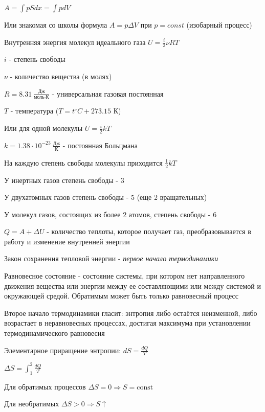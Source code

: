 \documentclass[12pt]{article}
\begin{document}
    $A = \int pS dx = \int p dV$

    Или знакомая со школы формула $A = p\Delta V$ при $p = const$ (изобарный процесс)

    Внутренняя энергия молекул идеального газа $U = \frac{i}{2} \nu R T$

    $i$ - степень свободы

    $\nu$ - количество вещества (в молях)

    $R = 8.31\ \frac{\text{Дж}}{\text{моль} \cdot \text{К}}$ - универсальная газовая постоянная

    $T$ - температура ($T = t^\circ C + 273.15$ К)

    Или для одной молекулы $U = \frac{i}{2} kT$

    $k = 1.38 \cdot 10^{-23}\ \frac{\text{Дж}}{\text{К}}$ - постоянная Больцмана

    На каждую степень свободы молекулы приходится $\frac{1}{2}kT$

    У инертных газов степень свободы - 3

    У двухатомных газов степень свободы - 5 (еще 2 вращательных)

    У молекул газов, состоящих из более 2 атомов, степень свободы - 6

    $Q = A + \Delta U$ - количество теплоты, которое получает газ, преобразовывается в работу и изменение внутренней энергии

    Закон сохранения тепловой энергии - \textit{первое начало термодинамики}

    Равновесное состояние - состояние системы, при котором нет направленного движения вещества или энергии 
    между ее составляющими или между системой и окружающей средой. 
    Обратимым может быть только равновесный процесс

    Второе начало термодинамики гласит: энтропия либо остаётся неизменной, либо возрастает в неравновесных процессах, 
    достигая максимума при установлении термодинамического равновесия

    Элементарное приращение энтропии: $dS = \frac{dQ}{T}$

    $\Delta S = \int_1^2 \frac{dQ}{T}$

    Для обратимых процессов $\Delta S = 0 \Longrightarrow S = \mathrm{const}$

    Для необратимых $\Delta S > 0 \Longrightarrow S \uparrow$

    

\end{document}
